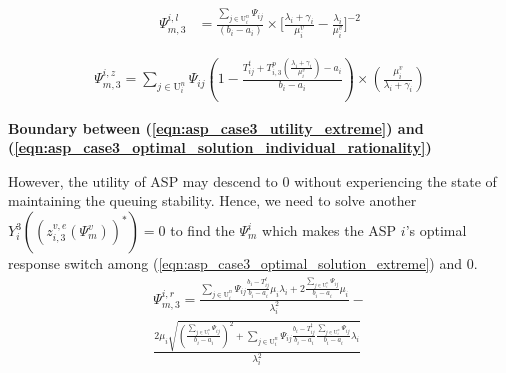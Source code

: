 \documentclass[10pt,journal, compsoc]{IEEEtran}
\begin{document}
\begin{equation}
\begin{aligned}
\Psi_{m,3}^{i,l}&= \frac{\sum_{j \in \mathrm{U}_i^n}\Psi_{ij}}{(b_i-a_i)}\times \big[\frac{\lambda_i+\gamma_i}{\mu_i^v} - \frac{\lambda_i}{\mu_i^v}\big]^{-2}
\end{aligned}
\end{equation}

\begin{equation}
\begin{aligned}
\Psi_{m,3}^{i,z}= \sum_{j \in \mathrm{U}_i^n}\Psi_{ij}(1-\frac{T_{ij}^t + T_{i,3}^p(\frac{\lambda_i+\gamma_i}{\mu_i^v})-a_i}{b_i-a_i})\times(\frac{\mu_i^v}{\lambda_i+\gamma_i})
\end{aligned}
\end{equation}

\textbf{Boundary between (\ref{eqn:asp_case3_utility_extreme}) and (\ref{eqn:asp_case3_optimal_solution_individual_rationality})}

However, the utility of ASP may descend to $0$ without experiencing the state of maintaining the queuing stability. Hence, we need to solve another $Y_i^3((z_{i,3}^{v,e}(\Psi_m^v))^*) = 0$ to find the $\Psi_m^i$ which makes the ASP $i$'s optimal response switch among (\ref{eqn:asp_case3_optimal_solution_extreme}) and $0$. 
\begin{multline}
\Psi_{m,3}^{i,r} = \frac{\sum_{j \in \mathrm{U}_i^n}\Psi_{ij}\frac{b_i-T_{ij}^t }{b_i-a_i}\mu_i\lambda_i+2\frac{\sum_{j \in \mathrm{U}_i^n}\Psi_{ij}}{b_i-a_i}\mu_i}{\lambda_i^2}- \\
\frac{2\mu_i\sqrt{(\frac{\sum_{j \in \mathrm{U}_i^n}\Psi_{ij}}{b_i-a_i})^2+\sum_{j \in \mathrm{U}_i^n}\Psi_{ij}\frac{b_i-T_{ij}^t}{b_i-a_i}\frac{\sum_{j \in \mathrm{U}_i^n}\Psi_{ij}}{b_i-a_i}\lambda_i}}{\lambda_i^2}
\end{multline}
\end{document}

